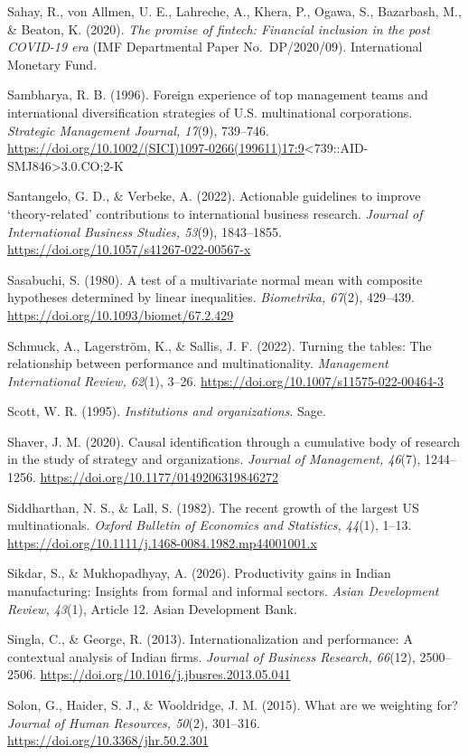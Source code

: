 \documentclass[
  a4paper,
  13pt]{extreport}
\begin{document}
Sahay, R., von Allmen, U. E., Lahreche, A., Khera, P., Ogawa, S.,
Bazarbash, M., \& Beaton, K. (2020). \emph{The promise of fintech:
Financial inclusion in the post COVID-19 era} (IMF Departmental Paper
No.~DP/2020/09). International Monetary Fund.

Sambharya, R. B. (1996). Foreign experience of top management teams and
international diversification strategies of U.S. multinational
corporations. \emph{Strategic Management Journal, 17}(9), 739--746.
\url{https://doi.org/10.1002/(SICI)1097-0266(199611)17:9}\textless739::AID-SMJ846\textgreater3.0.CO;2-K

Santangelo, G. D., \& Verbeke, A. (2022). Actionable guidelines to
improve `theory-related' contributions to international business
research. \emph{Journal of International Business Studies, 53}(9),
1843--1855. \url{https://doi.org/10.1057/s41267-022-00567-x}

Sasabuchi, S. (1980). A test of a multivariate normal mean with
composite hypotheses determined by linear inequalities.
\emph{Biometrika, 67}(2), 429--439.
\url{https://doi.org/10.1093/biomet/67.2.429}

Schmuck, A., Lagerström, K., \& Sallis, J. F. (2022). Turning the
tables: The relationship between performance and multinationality.
\emph{Management International Review, 62}(1), 3--26.
\url{https://doi.org/10.1007/s11575-022-00464-3}

Scott, W. R. (1995). \emph{Institutions and organizations}. Sage.

Shaver, J. M. (2020). Causal identification through a cumulative body of
research in the study of strategy and organizations. \emph{Journal of
Management, 46}(7), 1244--1256.
\url{https://doi.org/10.1177/0149206319846272}

Siddharthan, N. S., \& Lall, S. (1982). The recent growth of the largest
US multinationals. \emph{Oxford Bulletin of Economics and Statistics,
44}(1), 1--13.
\url{https://doi.org/10.1111/j.1468-0084.1982.mp44001001.x}

Sikdar, S., \& Mukhopadhyay, A. (2026). Productivity gains in Indian
manufacturing: Insights from formal and informal sectors. \emph{Asian
Development Review, 43}(1), Article 12. Asian Development Bank.

Singla, C., \& George, R. (2013). Internationalization and performance:
A contextual analysis of Indian firms. \emph{Journal of Business
Research, 66}(12), 2500--2506.
\url{https://doi.org/10.1016/j.jbusres.2013.05.041}

Solon, G., Haider, S. J., \& Wooldridge, J. M. (2015). What are we
weighting for? \emph{Journal of Human Resources, 50}(2), 301--316.
\url{https://doi.org/10.3368/jhr.50.2.301}
\end{document}
